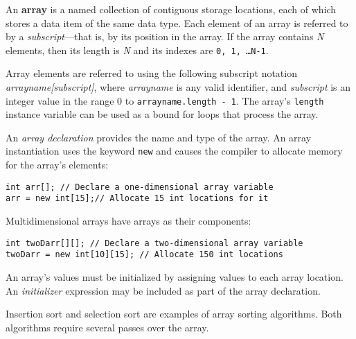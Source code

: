 \label{summaryof-important-points}
\begin{SMBL}

\item An {\bf array} is a named collection of contiguous
storage locations, each of which stores a data item of the same data
type.  Each element of an array is referred to by a {\it
subscript}---that is, by its position in the array.
If the array contains {\it N} elements, then its length is {\it N} and
its indexes are {\tt 0, 1, \dots N-1}.  

\item Array elements are referred to using the following subscript
notation {\em arrayname[subscript]}, where {\it arrayname} is any
valid identifier, and {\it subscript} is an integer value in the range
0 to {\tt arrayname.length - 1}. The array's {\tt length} instance
variable can be used as a bound for loops that process the array.

\item An {\it array declaration} provides the name and type of the
array.  An array instantiation uses the keyword {\tt new} and causes
the compiler to allocate memory for the array's elements:

\begin{jjjlisting}
\begin{lstlisting}
int arr[]; // Declare a one-dimensional array variable
arr = new int[15];// Allocate 15 int locations for it
\end{lstlisting}
\end{jjjlisting}

\item Multidimensional arrays have arrays as their components:

\begin{jjjlisting}
\begin{lstlisting}
int twoDarr[][]; // Declare a two-dimensional array variable
twoDarr = new int[10][15]; // Allocate 150 int locations
\end{lstlisting}
\end{jjjlisting}

\item  An array's values must be initialized by assigning
values to each array location.  An {\it initializer} expression may be included as part of the array
declaration.

\item Insertion sort and selection sort are examples of array sorting
algorithms.  Both algorithms require several passes over the array.


\end{SMBL}
